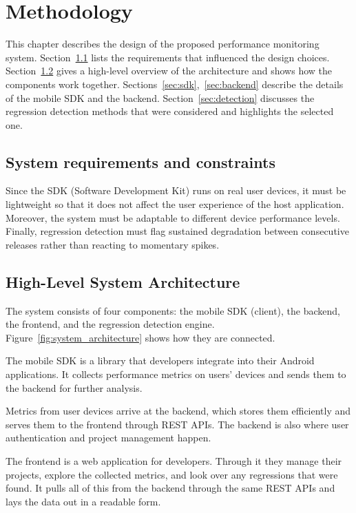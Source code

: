 
\chapter{Methodology}
\label{chap:met}

This chapter describes the design of the proposed performance monitoring system. Section~\ref{sec:req} lists the requirements that influenced the design choices. Section~\ref{sec:arch} gives a high-level overview of the architecture and shows how the components work together. Sections~\ref{sec:sdk},~\ref{sec:backend} describe the details of the mobile SDK and the backend. Section~\ref{sec:detection} discusses the regression detection methods that were considered and highlights the selected one.

\section{System requirements and constraints}
\label{sec:req}

Since the SDK (Software Development Kit) runs on real user devices, it must be lightweight so that it does not affect the user experience of the host application. Moreover, the system must be adaptable to different device performance levels. Finally, regression detection must flag sustained degradation between consecutive releases rather than reacting to momentary spikes.
\section{High-Level System Architecture}
\label{sec:arch}

The system consists of four components: the mobile SDK (client), the backend, the frontend, and the regression detection engine. Figure~\ref{fig:system_architecture} shows how they are connected.

The mobile SDK is a library that developers integrate into their Android applications. It collects performance metrics on users' devices and sends them to the backend for further analysis.

Metrics from user devices arrive at the backend, which stores them efficiently and serves them to the frontend through REST APIs. The backend is also where user authentication and project management happen.

The frontend is a web application for developers. Through it they manage their projects, explore the collected metrics, and look over any regressions that were found. It pulls all of this from the backend through the same REST APIs and lays the data out in a readable form.


